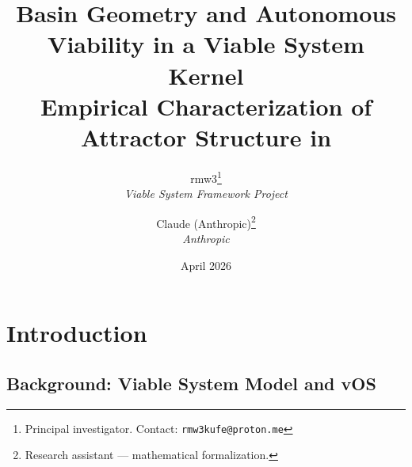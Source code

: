 \documentclass[11pt, a4paper]{article}
\title{%
  \textbf{Basin Geometry and Autonomous Viability in a Viable System Kernel}\\[4pt]
  \large Empirical Characterization of Attractor Structure in \vOS{}
}
\author{
  rmw3\thanks{Principal investigator. Contact: \texttt{rmw3kufe@proton.me}} \\[2pt]
  \small\textit{Viable System Framework Project} \\[6pt]
  \and
  Claude (Anthropic)\thanks{Research assistant --- mathematical formalization.} \\[2pt]
  \small\textit{Anthropic}
}
\date{April 2026}
\newcommand{\vOS}{\textsf{vOS}}
\begin{document}
\maketitle

\begin{abstract}
\end{abstract}

\section{Introduction}
\label{sec:intro}

%
%
%
%
%

\subsection{Background: Viable System Model and \vOS{}}
\label{sec:background}
\end{document}
